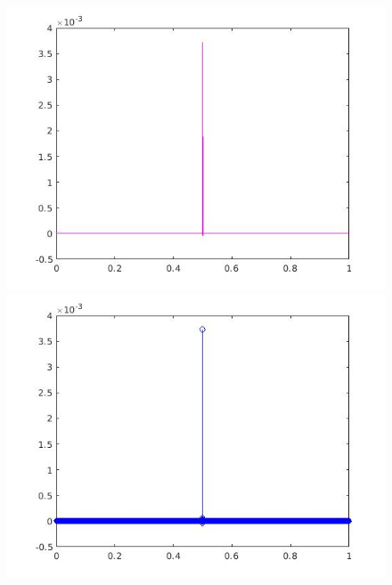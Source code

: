 \documentclass[a4paper,11pt]{article}
\begin{document}
\begin{figure}[!hp]
\centering
\begin{minipage}{.5\textwidth}
  \centering
  \includegraphics[width=1\linewidth]{images/lab2_57.jpg}
\end{minipage}%
\begin{minipage}{.5\textwidth}
  \centering
  \includegraphics[width=1\linewidth]{images/lab2_58.jpg}
\end{minipage}
\end{figure}
\end{document}
